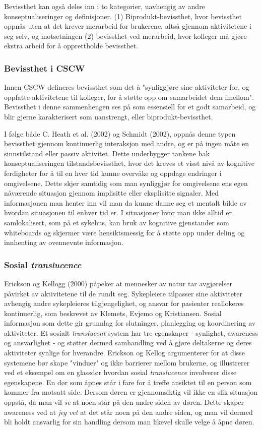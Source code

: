 \noindent
Bevissthet kan også deles inn i to kategorier, uavhengig av andre konseptualiseringer og definisjoner. (1) Biprodukt-bevissthet, hvor bevissthet oppnås uten at det krever merarbeid for brukerene, altså gjennom aktivitetene i seg selv, og motsetningen (2) bevissthet ved merarbeid, hvor kolleger må gjøre ekstra arbeid for å opprettholde bevissthet\cite{Randell}. 


\subsubsection{Bevissthet i CSCW}
Innen CSCW defineres bevissthet som det å "synliggjøre sine aktiviteter for, og oppfatte aktivitetene til kolleger, for å støtte opp om samarbeidet dem imellom". Bevissthet i denne sammenhengen ses på som essensiell for et godt samarbeid, og blir gjerne karakterisert som uanstrengt, eller biprodukt-bevissthet\cite{Randell}. 

\noindent
I følge både C. Heath et al. (2002) og Schmidt (2002), oppnås denne typen bevissthet gjennom kontinuerlig interaksjon med andre, og er på ingen måte en sinnstilstand eller passiv aktivitet. Dette underbygger tankene bak konseptualiseringen tilstandsbevissthet, hvor det kreves et visst nivå av kognitive ferdigheter for å til en hver tid kunne overvåke og oppdage endringer i omgivelsene. Dette skjer samtidig som man synliggjør for omgivelsene ens egen nåværende situasjon gjennom implisitte eller eksplisitte signaler. Med informasjonen man henter inn vil man da kunne danne seg et mentalt bilde av hvordan situasjonen til enhver tid er. I situasjoner hvor man ikke alltid er samlokalisert, som på et sykehus, kan bruk av kognitive gjenstander som whiteboards og skjermer være hensiktsmessig for å støtte opp under deling og innhenting av ovennevnte informasjon\cite{Bardram04}. 

\subsubsection{Sosial \emph{translucence}}
Erickson og Kellogg (2000) påpeker at mennesker av natur tar avgjørelser påvirket av aktivitetene til de rundt seg. Sykepleiere tilpasser sine aktiviteter avhengig andre sykepleieres tilgjengelighet, og ansvar for pasienter reallokeres kontinuerlig, som beskrevet av Klemets, Evjemo og Kristiansen. Sosial informasjon som dette gir grunnlag for slutninger, planlegging og koordinering av aktiviteter. 
Et sosialt \emph{translucent} system har tre egenskaper - synlighet, awareness og ansvarlighet - og støtter dermed samhandling ved å gjøre deltakerne og deres aktiviteter synlige for hverandre. Erickson og Kellog argumenterer for at disse systemene bør skape "vinduer" og ikke barrierer mellom brukerne, og illustrerer ved et eksempel om en glassdør hvordan sosial \emph{translucence} involverer disse egenskapene. 
En dør som åpnes står i fare for å treffe ansiktet til en person som kommer fra motsatt side. Dersom døren er gjennomsiktig vil ikke en slik situasjon oppstå, da man vil \emph{se} at noen står på den andre siden av døren. Dette skaper awareness ved at \emph{jeg vet} at det står noen på den andre siden, og man vil dermed bli holdt ansvarlig for sin handling dersom man likevel skulle velge å åpne døren.

